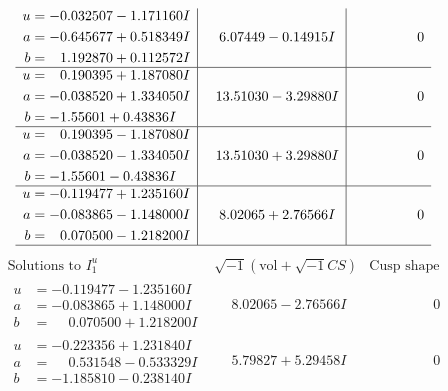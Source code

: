 \documentclass[1p]{elsarticle_modified}
\theoremstyle{definition}
\newcommand{\I}{\sqrt{-1}}
\begin{document}
$$\begin{array}{c|c|c}
\begin{aligned}
u &= -0.032507 - 1.171160 I \\
a &= -0.645677 + 0.518349 I \\
b &= \phantom{-}1.192870 + 0.112572 I\end{aligned}
 & \phantom{-}6.07449 - 0.14915 I & \phantom{-0.000000 } 0 \\ \hline\begin{aligned}
u &= \phantom{-}0.190395 + 1.187080 I \\
a &= -0.038520 + 1.334050 I \\
b &= -1.55601 + 0.43836 I\end{aligned}
 & \phantom{-}13.51030 - 3.29880 I & \phantom{-0.000000 } 0 \\ \hline\begin{aligned}
u &= \phantom{-}0.190395 - 1.187080 I \\
a &= -0.038520 - 1.334050 I \\
b &= -1.55601 - 0.43836 I\end{aligned}
 & \phantom{-}13.51030 + 3.29880 I & \phantom{-0.000000 } 0 \\ \hline\begin{aligned}
u &= -0.119477 + 1.235160 I \\
a &= -0.083865 - 1.148000 I \\
b &= \phantom{-}0.070500 - 1.218200 I\end{aligned}
 & \phantom{-}8.02065 + 2.76566 I & \phantom{-0.000000 } 0\\
 \hline 
 \end{array}$$\newpage$$\begin{array}{c|c|c}  
\text{Solutions to }I^u_{1}& \I (\text{vol} + \sqrt{-1}CS) & \text{Cusp shape}\\
 \hline 
\begin{aligned}
u &= -0.119477 - 1.235160 I \\
a &= -0.083865 + 1.148000 I \\
b &= \phantom{-}0.070500 + 1.218200 I\end{aligned}
 & \phantom{-}8.02065 - 2.76566 I & \phantom{-0.000000 } 0 \\ \hline\begin{aligned}
u &= -0.223356 + 1.231840 I \\
a &= \phantom{-}0.531548 - 0.533329 I \\
b &= -1.185810 - 0.238140 I\end{aligned}
 & \phantom{-}5.79827 + 5.29458 I & \phantom{-0.000000 } 0 \\ \hline\begin{aligned}

\end{aligned}
\end{array}$$
\end{document}
